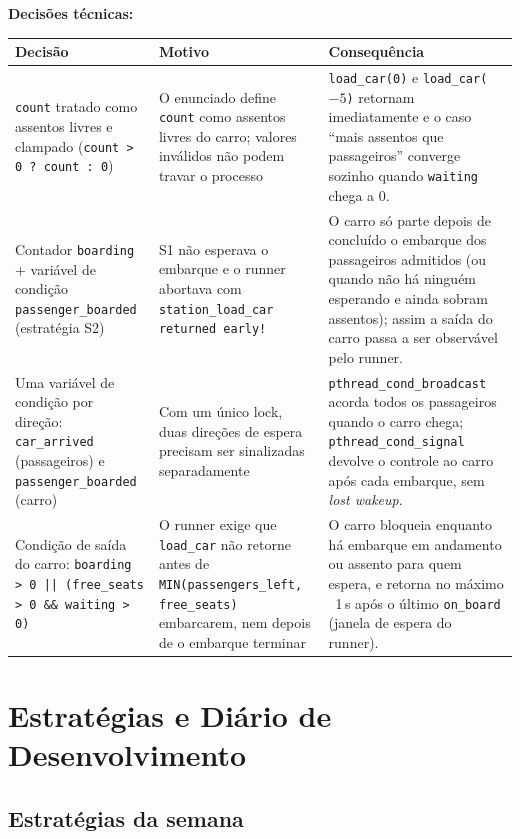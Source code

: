 \documentclass[11pt,a4paper]{article}
\begin{document}
\vspace{6pt}
\textbf{Decisões técnicas:}

\noindent\begin{tabularx}{\textwidth}{L{5.6cm} L{5.4cm} Y}
\toprule
\textbf{Decisão} & \textbf{Motivo} & \textbf{Consequência} \\
\midrule
\texttt{count} tratado como assentos livres e clampado
(\texttt{count > 0 ? count : 0}) &
O enunciado define \texttt{count} como assentos livres do carro; valores
inválidos não podem travar o processo &
\texttt{load\_car(0)} e \texttt{load\_car($-5$)} retornam imediatamente e o caso
``mais assentos que passageiros'' converge sozinho quando \texttt{waiting} chega a 0. \\
\addlinespace
Contador \texttt{boarding} + variável de condição \texttt{passenger\_boarded}
(estratégia S2) &
S1 não esperava o embarque e o runner abortava com
\texttt{station\_load\_car returned early!} &
O carro só parte depois de concluído o embarque dos passageiros admitidos
(ou quando não há ninguém esperando e ainda sobram assentos); assim a saída do
carro passa a ser observável pelo runner. \\
\addlinespace
Uma variável de condição por direção: \texttt{car\_arrived}
(passageiros) e \texttt{passenger\_boarded} (carro) &
Com um único lock, duas direções de espera precisam ser sinalizadas
separadamente &
\texttt{pthread\_\allowbreak cond\_\allowbreak broadcast} acorda todos os passageiros quando o carro
chega; \texttt{pthread\_cond\_signal} devolve o controle ao carro após cada
embarque, sem \emph{lost wakeup}. \\
\addlinespace
Condição de saída do carro:
\texttt{boarding > 0 || (free\_seats > 0 \&\& waiting > 0)} &
O runner exige que \texttt{load\_car} não retorne antes de
\texttt{MIN(passengers\_left, free\_seats)} embarcarem, nem depois de o embarque
terminar &
O carro bloqueia enquanto há embarque em andamento ou assento para quem espera,
e retorna no máximo ~1\,s após o último \texttt{on\_board} (janela de espera do
runner). \\
\bottomrule
\end{tabularx}

\section{Estratégias e Diário de Desenvolvimento}

\subsection{Estratégias da semana}
\end{document}
